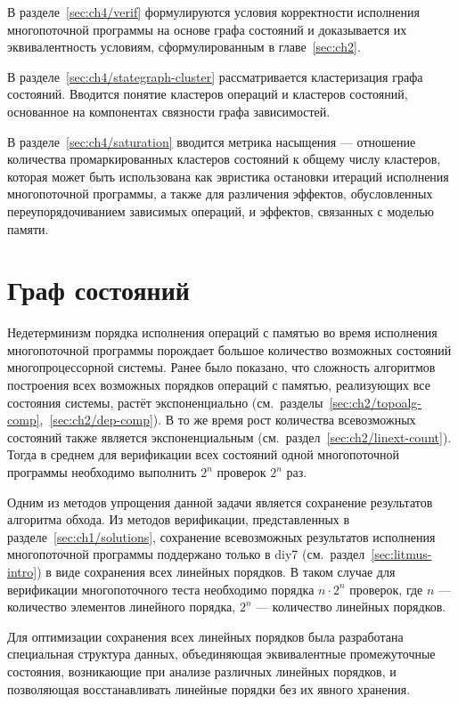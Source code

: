 В разделе~\ref{sec:ch4/verif} формулируются условия корректности
исполнения многопоточной программы на основе графа состояний и
доказывается их эквивалентность условиям, сформулированным в
главе~\ref{sec:ch2}.

В разделе~\ref{sec:ch4/stategraph-cluster} рассматривается
кластеризация графа состояний. Вводится понятие кластеров операций и
кластеров состояний, основанное на компонентах связности графа зависимостей.

В разделе~\ref{sec:ch4/saturation} вводится метрика насыщения —
отношение количества промаркированных кластеров состояний к общему
числу кластеров, которая может быть использована как эвристика
остановки итераций исполнения многопоточной программы, а также для
различения эффектов, обусловленных переупорядочиванием зависимых
операций, и эффектов, связанных с моделью памяти.

\section{Граф состояний}
\label{sec:ch4/stategraph}

Недетерминизм порядка исполнения операций с памятью во время
исполнения многопоточной программы порождает большое количество
возможных состояний многопроцессорной системы. Ранее было показано,
что сложность алгоритмов построения всех возможных порядков операций
с памятью, реализующих все состояния системы, растёт
экспоненциально
(см.~разделы~\ref{sec:ch2/topoalg-comp},~\ref{sec:ch2/dep-comp}). В
то же время рост количества всевозможных состояний также является
экспоненциальным (см.~раздел~\ref{sec:ch2/linext-count}). Тогда в среднем
для верификации всех состояний одной многопоточной программы
необходимо выполнить $2^n$ проверок $2^n$ раз.

Одним из методов упрощения данной задачи является сохранение
результатов алгоритма обхода. Из методов верификации, представленных
в разделе~\ref{sec:ch1/solutions}, сохранение
всевозможных результатов исполнения многопоточной программы
поддержано только в diy7 (см.~раздел~\ref{sec:litmus-intro}) в виде сохранения
всех линейных порядков. В таком случае для верификации многопоточного
теста необходимо порядка $n \cdot 2^n$ проверок, где $n$ — количество
элементов линейного порядка, $2^n$ — количество линейных порядков.

Для оптимизации сохранения всех линейных порядков была разработана
специальная структура данных, объединяющая эквивалентные
промежуточные состояния, возникающие при анализе различных линейных
порядков, и позволяющая восстанавливать линейные порядки без их явного хранения.

